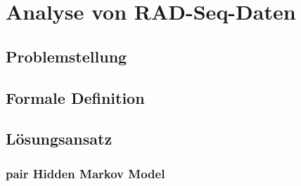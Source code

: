 \chapter{Analyse von RAD-Seq-Daten} \label{chapter:kap2}
\section{Problemstellung} \label{sec:probl}

\section{Formale Definition} \label{sec:formal}
\section{Lösungsansatz} \label{sec:solution}
\subsection{pair Hidden Markov Model} \label{subsec:phmm}